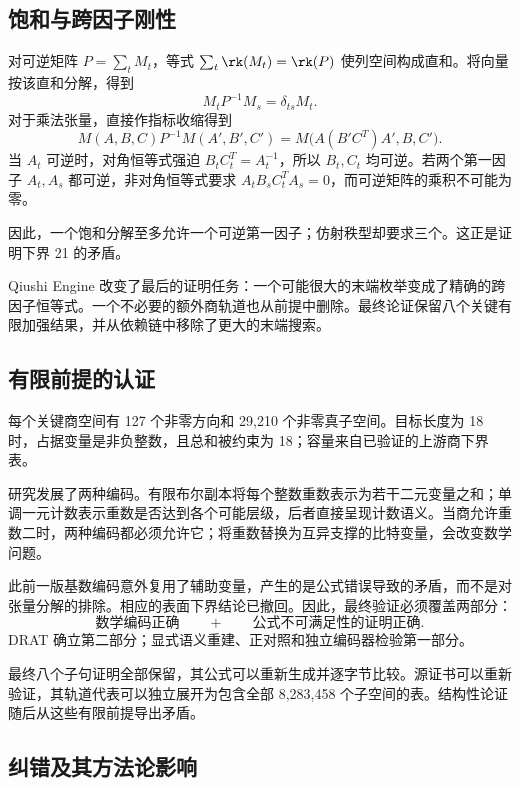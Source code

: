 \subsection{饱和与跨因子刚性}\label{route:saturation}

对可逆矩阵 $P=\sum_tM_t$，等式 $\sum_t\rk(M_t)=\rk(P)$ 使列空间构成直和。将向量按该直和分解，得到
\[
 M_tP^{-1}M_s=\delta_{ts}M_t.
\]
对于乘法张量，直接作指标收缩得到
\[
 M(A,B,C)P^{-1}M(A',B',C')
 =M\bigl(A(B'C^T)A',B,C'\bigr).
\]
当 $A_t$ 可逆时，对角恒等式强迫 $B_tC_t^T=A_t^{-1}$，所以 $B_t,C_t$ 均可逆。若两个第一因子 $A_t,A_s$ 都可逆，非对角恒等式要求 $A_tB_sC_t^TA_s=0$，而可逆矩阵的乘积不可能为零。

因此，一个饱和分解至多允许一个可逆第一因子；仿射秩型却要求三个。这正是证明下界 21 的矛盾。

Qiushi Engine 改变了最后的证明任务：一个可能很大的末端枚举变成了精确的跨因子恒等式。一个不必要的额外商轨道也从前提中删除。最终论证保留八个关键有限加强结果，并从依赖链中移除了更大的末端搜索。

\subsection{有限前提的认证}\label{route:certificates}

每个关键商空间有 127 个非零方向和 29,210 个非零真子空间。目标长度为 18 时，占据变量是非负整数，且总和被约束为 18；容量来自已验证的上游商下界表。

研究发展了两种编码。有限布尔副本将每个整数重数表示为若干二元变量之和；单调一元计数表示重数是否达到各个可能层级，后者直接呈现计数语义。当商允许重数二时，两种编码都必须允许它；将重数替换为互异支撑的比特变量，会改变数学问题。

此前一版基数编码意外复用了辅助变量，产生的是公式错误导致的矛盾，而不是对张量分解的排除。相应的表面下界结论已撤回。因此，最终验证必须覆盖两部分：
\[
 \text{数学编码正确}
 \qquad+\qquad
 \text{公式不可满足性的证明正确}.
\]
DRAT 确立第二部分；显式语义重建、正对照和独立编码器检验第一部分。

最终八个子句证明全部保留，其公式可以重新生成并逐字节比较。源证书可以重新验证，其轨道代表可以独立展开为包含全部 8,283,458 个子空间的表。结构性论证随后从这些有限前提导出矛盾。

\subsection{纠错及其方法论影响}\label{route:corrections}

